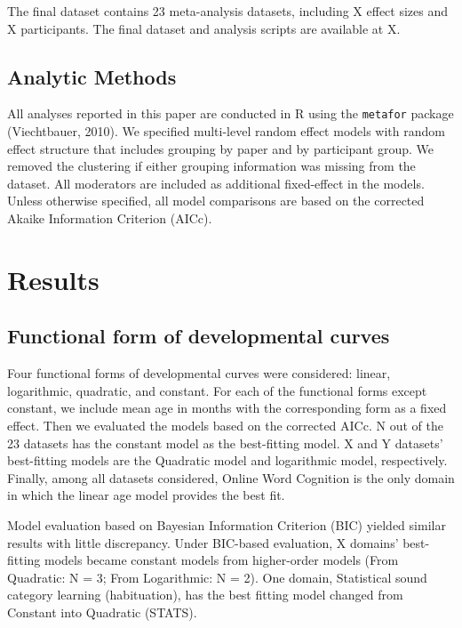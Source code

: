 \documentclass[10pt, letterpaper]{article}
\begin{document}
The final dataset contains 23 meta-analysis datasets, including X effect
sizes and X participants. The final dataset and analysis scripts are
available at X.

\hypertarget{analytic-methods}{%
\subsection{Analytic Methods}\label{analytic-methods}}

All analyses reported in this paper are conducted in R using the
\texttt{metafor} package (Viechtbauer, 2010). We specified multi-level
random effect models with random effect structure that includes grouping
by paper and by participant group. We removed the clustering if either
grouping information was missing from the dataset. All moderators are
included as additional fixed-effect in the models. Unless otherwise
specified, all model comparisons are based on the corrected Akaike
Information Criterion (AICc).

\hypertarget{results}{%
\section{Results}\label{results}}

\hypertarget{functional-form-of-developmental-curves}{%
\subsection{Functional form of developmental
curves}\label{functional-form-of-developmental-curves}}

Four functional forms of developmental curves were considered: linear,
logarithmic, quadratic, and constant. For each of the functional forms
except constant, we include mean age in months with the corresponding
form as a fixed effect. Then we evaluated the models based on the
corrected AICc. N out of the 23 datasets has the constant model as the
best-fitting model. X and Y datasets' best-fitting models are the
Quadratic model and logarithmic model, respectively. Finally, among all
datasets considered, Online Word Cognition is the only domain in which
the linear age model provides the best fit.

Model evaluation based on Bayesian Information Criterion (BIC) yielded
similar results with little discrepancy. Under BIC-based evaluation, X
domains' best-fitting models became constant models from higher-order
models (From Quadratic: N = 3; From Logarithmic: N = 2). One domain,
Statistical sound category learning (habituation), has the best fitting
model changed from Constant into Quadratic (STATS).
\end{document}
